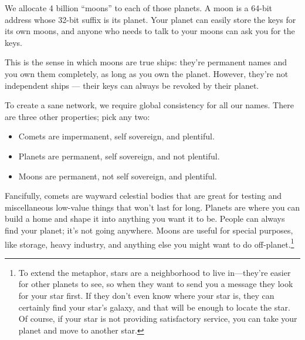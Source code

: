 \documentclass[twoside]{article}
\begin{document}
We allocate 4 billion ``moons'' to each of those planets. A moon is a
64-bit address whose 32-bit suffix is its planet. Your planet can easily
store the keys for its own moons, and anyone who needs to talk to your
moons can ask you for the keys.

This is the sense in which moons are true ships: they're permanent names
and you own them completely, as long as you own the planet. However,
they're not independent ships --- their keys can always be revoked by
their planet.

To create a sane network, we require global consistency for all our
names. There are three other properties; pick any two:

\begin{itemize}
\item
  Comets are impermanent, self sovereign, and plentiful.
\item
  Planets are permanent, self sovereign, and not plentiful.
\item
  Moons are permanent, not self sovereign, and plentiful.
\end{itemize}

Fancifully, comets are wayward celestial bodies that are great for
testing and miscellaneous low-value things that won't last for long.
Planets are where you can build a home and shape it into anything you
want it to be. People can always find your planet; it's not going
anywhere. Moons are useful for special purposes, like storage, heavy
industry, and anything else you might want to do
off-planet.\footnote{To extend the metaphor, stars are a neighborhood to live in—they're
easier for other planets to see, so when they want to send you a
message they look for your star first. If they don't even know where
your star is, they can certainly find your star's galaxy, and that
will be enough to locate the star. Of course, if your star is not
providing satisfactory service, you can take your planet and move to
another star.} \tombstone{}

\printbibliography
\end{document}
